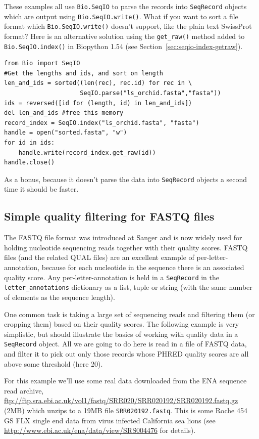 \documentclass{report}
\begin{document}
These examples all use \verb|Bio.SeqIO| to parse the records into
\verb|SeqRecord| objects which are output using \verb|Bio.SeqIO.write()|.
What if you want to sort a file format which \verb|Bio.SeqIO.write()| doesn't
support, like the plain text SwissProt format? Here is an alternative
solution using the \verb|get_raw()| method added to \verb|Bio.SeqIO.index()|
in Biopython 1.54 (see Section~\ref{sec:seqio-index-getraw}).

\begin{verbatim}
from Bio import SeqIO
#Get the lengths and ids, and sort on length         
len_and_ids = sorted((len(rec), rec.id) for rec in \
                     SeqIO.parse("ls_orchid.fasta","fasta"))
ids = reversed([id for (length, id) in len_and_ids])
del len_and_ids	#free this memory
record_index = SeqIO.index("ls_orchid.fasta", "fasta")
handle = open("sorted.fasta", "w")
for id in ids:
    handle.write(record_index.get_raw(id))
handle.close()
\end{verbatim}

As a bonus, because it doesn't parse the data into \verb|SeqRecord| objects
a second time it should be faster.

\subsection{Simple quality filtering for FASTQ files}
\label{sec:FASTQ-filtering-example}

The FASTQ file format was introduced at Sanger and is now widely used for
holding nucleotide sequencing reads together with their quality scores.
FASTQ files (and the related QUAL files) are an excellent example of
per-letter-annotation, because for each nucleotide in the sequence there is
an associated quality score.  Any per-letter-annotation is held in a
\verb|SeqRecord| in the \verb|letter_annotations| dictionary as a list,
tuple or string (with the same number of elements as the sequence length).

One common task is taking a large set of sequencing reads and filtering them
(or cropping them) based on their quality scores.
The following example is very simplistic, but should illustrate the basics of
working with quality data in a \verb|SeqRecord| object.  All we are going to
do here is read in a file of FASTQ data, and filter it to pick out only those
records whose PHRED quality scores are all above some threshold (here 20).

For this example we'll use some real data downloaded from the ENA sequence
read archive,
\url{ftp://ftp.sra.ebi.ac.uk/vol1/fastq/SRR020/SRR020192/SRR020192.fastq.gz}
(2MB) which unzips to a 19MB file \texttt{SRR020192.fastq}. This is some
Roche 454 GS FLX single end data from virus infected California sea lions
(see \url{http://www.ebi.ac.uk/ena/data/view/SRS004476} for details).
\end{document}
